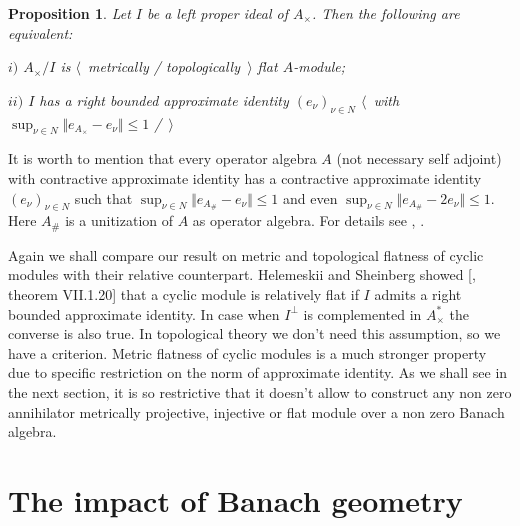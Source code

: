 \documentclass[12pt]{article}
\newtheorem{proposition}[theorem]{Proposition}
\begin{document}
\begin{proposition}\label{MetTopFlatCycModCharac} Let $I$ be a left proper ideal of $A_\times $. Then the following are equivalent:

$i)$ $A_\times /I$ is $\langle$~metrically / topologically~$\rangle$ flat $A$-module;

$ii)$ $I$ has a right bounded approximate identity $(e_\nu)_{\nu\in N}$ $\langle$~with $\sup_{\nu\in N}\Vert e_{A_\times }-e_\nu\Vert\leq 1$ /~$\rangle$
\end{proposition}

It is worth to mention that every operator algebra $A$ (not necessary self adjoint) with contractive approximate identity has a contractive approximate identity $(e_\nu)_{\nu\in N}$ such that $\sup_{\nu\in N}\Vert e_{A_\#}-e_\nu\Vert\leq 1$ and even $\sup_{\nu\in N}\Vert e_{A_\#}-2e_\nu\Vert\leq 1$. Here $A_\#$ is a unitization of $A$ as operator algebra. For details see \cite{PosAndApproxIdinBanAlg}, \cite{BleContrAppIdInOpAlg}.

Again we shall compare our result on metric and topological flatness of cyclic modules with their relative counterpart. Helemeskii and Sheinberg showed [\cite{HelHomolBanTopAlg}, theorem VII.1.20] that a cyclic module is relatively flat if $I$ admits a right bounded approximate identity. In case when $I^\perp$ is complemented in $A_\times^*$ the converse is also true. In topological theory we don't need this assumption, so we have a criterion. Metric flatness of cyclic modules is a much stronger property due to specific restriction on the norm of approximate identity. As we shall see in the next section, it is so restrictive that it doesn't allow to construct any non zero annihilator metrically projective, injective or flat module over a non zero Banach algebra.


\section{The impact of Banach geometry}
\label{SectionTheImpactOfBanachGeometry}


\end{document}
